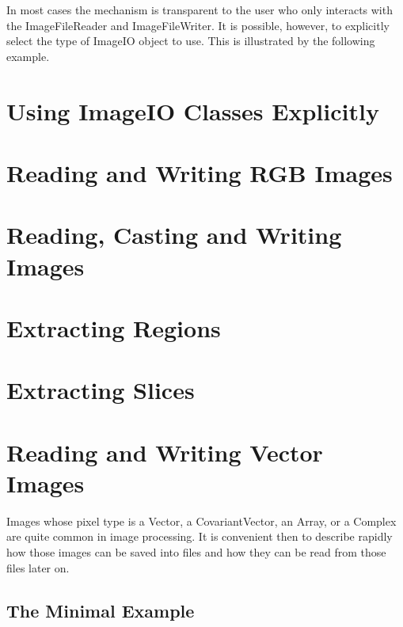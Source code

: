 In most cases the mechanism is transparent to the user who only interacts
with the ImageFileReader and ImageFileWriter. It is
possible, however, to explicitly select the type of ImageIO object
to use.  This is illustrated by the following example.

\section{Using ImageIO Classes Explicitly}
\label{sec:ImageReadExportVTK}



\section{Reading and Writing RGB Images}
\label{sec:RGBImagReadWrite}


\section{Reading, Casting and Writing Images}
\label{sec:ImagReadCastWrite}


\section{Extracting Regions}
\label{sec:ImagReadRegionOfInterestWrite}


\section{Extracting Slices}
\label{sec:ImagReadExtractWrite}



\section{Reading and Writing Vector Images}
\label{sec:VectorImagReadWrite}

Images whose pixel type is a Vector, a CovariantVector, an Array, or a Complex
are quite common in image processing. It is convenient then to describe rapidly
how those images can be saved into files and how they can be read from those
files later on.

\subsection{The Minimal Example}
\label{VectorImageReadWrite}


